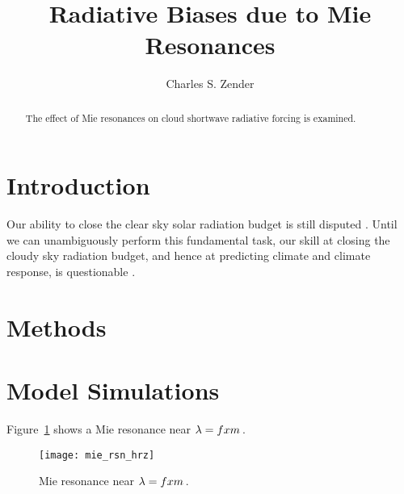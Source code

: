 \documentclass[agupp,twoside]{aguplus} %
\begin{document}
\def\paperchaptertitle{Radiative Biases due to Mie Resonances} 
\title{\paperchaptertitle}

\author{Charles S. Zender}

\begin{abstract}
The effect of Mie resonances on cloud shortwave radiative forcing
is examined.
\end{abstract}

\section{Introduction}\label{sxn:ntr}


Our ability to close the clear sky solar radiation budget is still
disputed \cite[e.g.,][and references therein]{RaV97}. 
Until we can unambiguously perform this fundamental task, our skill at
closing the cloudy sky radiation budget, and hence at predicting
climate and climate response, is questionable \cite[e.g.,][]{CPB89}. 

\section{Methods}\label{sxn:mth}

\section{Model Simulations}\label{sxn:mdl} 

Figure~\ref{fgr:rsn_hrz} shows a Mie resonance near $\lambda = fxm$\,\um.
\begin{figure}
\begin{center}
\texttt{[image: mie\_rsn\_hrz]}\vfill
\end{center}
\caption{
Mie resonance near $\lambda = fxm$\,\um.
\label{fgr:rsn_hrz}}
\end{figure}
\end{document}
